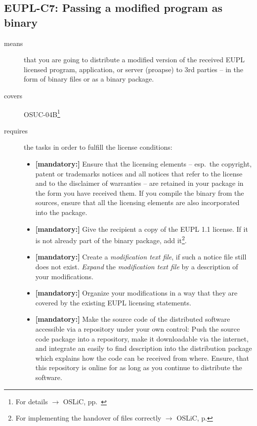 \subsection{EUPL-C7: Passing a modified program as binary}
\label{OSUC-04B-EUPL}

\begin{description}
\item[means] that you are going to distribute a modified version of the received
EUPL licensed pro\-gram, application, or server (proapse) to 3rd parties -- in
the form of binary files or as a binary package.
\item[covers] OSUC-04B\footnote{For details $\rightarrow$ OSLiC, pp.\
\pageref{OSUC-04B-DEF}}
\item[requires] the tasks in order to fulfill the license conditions:
\begin{itemize}

  \item \textbf{[mandatory:]} Ensure that the licensing elements -- esp.\ the
  copyright, patent or trademarks notices and all notices that refer to the
  license and to the disclaimer of warranties -- are retained in your package in
  the form you have received them. If you compile the binary from the sources,
  ensure that all the licensing elements are also incorporated into the package.

 \item \textbf{[mandatory:]} Give the recipient a copy of the EUPL 1.1
  license. If it is not already part of the binary package, add
  it\footnote{For implementing the handover of files correctly $\rightarrow$
  OSLiC, p. \pageref{DistributingFilesHint}}.
  
  \item \textbf{[mandatory:]} Create a \emph{modification text file}, if such a
  notice file still does not exist. \emph{Expand} the \emph{modification text
  file} by a description of your modifications.

  \item \textbf{[mandatory:]} Organize your modifications in a way that they are
  covered by the existing EUPL licensing statements.
  
  \item \textbf{[mandatory:]} Make the source code of the distributed software
  accessible via a repository under your own control: Push the source code
  package into a repository, make it downloadable via the internet, and
  integrate an easily to find description into the distribution package which
  explains how the code can be received from where. Ensure, that this repository
  is online for as long as you continue to distribute the software.
  

\end{itemize}
\end{description}
